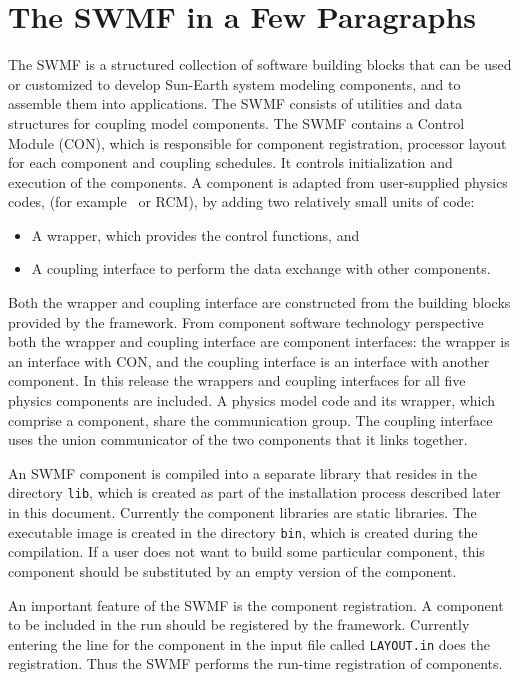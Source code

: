 \section{The SWMF in a Few Paragraphs}

The SWMF is a structured collection of software building blocks that
can be used or customized to develop Sun-Earth system modeling
components, and to assemble them into applications. The SWMF consists
of utilities and data structures for coupling model components. The
SWMF contains a Control Module (CON), which is responsible for
component registration, processor layout for each component and
coupling schedules.  It controls initialization and execution of the
components. A component is adapted from user-supplied physics codes,
(for example \BATSRUS\ or RCM), by adding two relatively small units
of code:
\begin{itemize}
\item A wrapper, which provides the control functions, and
\item A coupling interface to perform the data exchange with other
components.
\end{itemize}
Both the wrapper and coupling interface are constructed from the
building blocks provided by the framework. From 
component software technology perspective both the wrapper and
coupling interface are component interfaces: the wrapper is an
interface with CON, and the coupling interface is an interface with
another component. In this release the wrappers and coupling
interfaces for all five physics components are included. A physics
model code and its wrapper, which comprise a component, share the
communication group.  The coupling interface uses the union
communicator of the two components that it links together.

An SWMF component is compiled into a separate library that resides in
the directory {\tt lib}, which is created as part of the installation
process described later in this document.  Currently the component
libraries are static libraries. The executable image is created in the
directory {\tt bin}, which is created during the compilation.  If a
user does not want to build some particular component, this component
should be substituted by an empty version of the component.

An important feature of the SWMF is the component registration.  A
component to be included in the run should be registered by the
framework.  Currently entering the line for the component in the input
file called {\tt LAYOUT.in} does the registration.  Thus the SWMF
performs the run-time registration of components.

